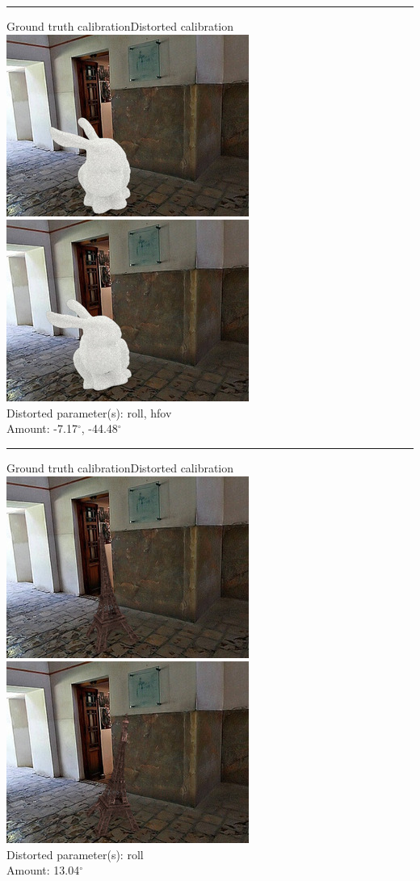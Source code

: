 \begin{minipage}{\linewidth}
\centering
\hrule\vspace{1em}
Ground truth calibration\hspace{0.2\linewidth}Distorted calibration\
\includegraphics[width=0.45\linewidth]{study/thumb/pano_ahxngimugqzaln-1_5_gt.jpg}
\includegraphics[width=0.45\linewidth]{study/thumb/pano_ahxngimugqzaln-1_5_dc.jpg}\\
Distorted parameter(s): roll, hfov\\
Amount: -7.17$^\circ$, -44.48$^\circ$
\end{minipage}

\begin{minipage}{\linewidth}
\centering
\hrule\vspace{1em}
Ground truth calibration\hspace{0.2\linewidth}Distorted calibration\
\includegraphics[width=0.45\linewidth]{study/thumb/pano_ahxngimugqzaln-1_6_gt.jpg}
\includegraphics[width=0.45\linewidth]{study/thumb/pano_ahxngimugqzaln-1_6_dc.jpg}\\
Distorted parameter(s): roll\\
Amount: 13.04$^\circ$
\end{minipage}

